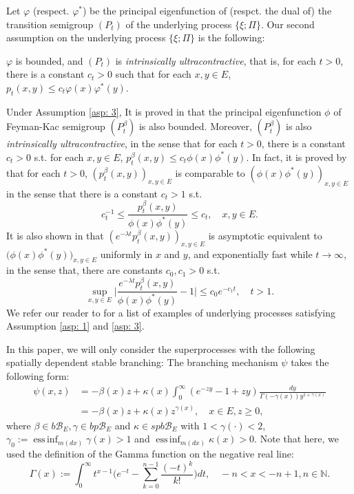 \documentclass[12pt, a4paper]{amsart}
\theoremstyle{definition}
\newenvironment{asp}[1]{\renewcommand\theinnerasp{#1}\innerasp}{\endinnerasp}
\numberwithin{equation}{section}
\begin{document}
	Let $\varphi$ (respect. $\varphi^*$) be the principal eigenfunction of (respct. the dual of) the transition semigroup $(P_t)$ of the underlying process $\{\xi;\Pi\}$. Our second assumption on the underlying process $\{\xi; \Pi\}$ is the following:

\begin{asp}{3} \label{asp: 3}
	$\varphi$ is bounded, and $(P_t)$ is \emph{intrinsically ultracontractive}, that is, for each $t>0$, there is a constant $c_t >0$ such that for each $x,y\in E$, $p_t(x,y) \leq c_t \varphi(x) \varphi^*(y)$.
\end{asp}
	
	Under Assumption \ref{asp: 3},	It is proved in \cite{RenSongZhang2017Central,RenSongZhang2015Limit} that the principal eigenfunction $\phi$ of Feyman-Kac semigroup $(P^\beta_t)$ is also bounded.
	Moreover, $(P^\beta_t)$ is also \emph{intrinsically ultracontractive}, in the sense that for each $t>0$, there is a constant $c_t >0$ s.t. for each $x,y\in E$, $p^\beta_t(x,y) \leq c_t \phi(x) \phi^*(y)$.
	In fact, it is proved by \cite{KimSong2008Intrinsic} that for each $t>0$, $(p^\beta_t(x,y))_{x,y\in E}$ is comparable to $(\phi(x)\phi^*(y))_{x,y\in E}$ in the sense that there is a constant $c_t > 1$ s.t.
\[\label{eq: p-t-beta is comparable to phi phi-star}
	c_t^{-1}
	\leq \frac {p^\beta_t(x,y)} {\phi(x)\phi^*(y)}
	\leq c_t,
	\quad x,y \in E.
\]
	It is also shown in \cite{KimSong2008Intrinsic} that $(e^{-\lambda t}p^\beta_t(x,y))_{x,y\in E}$ is asymptotic equivalent to $\big(\phi(x)\phi^*(y)\big)_{x,y\in E}$ uniformly in $x$ and $y$, and exponentially fast while $t\to \infty$, in the sense that, there are constants $c_0,c_1 > 0$ s.t.
\[\label{eq:q(t,x,y)}
	\sup_{x,y\in E} \big|\frac{e^{-\lambda t}p^\beta_t(x,y)}{\phi(x)\phi^*(y)} - 1 \big| \leq c_0 e^{-c_1 t},
	\quad t > 1.
\]
	We refer our reader to \cite{RenSongZhang2015Limit} for a list of examples of underlying processes satisfying Assumption \ref{asp: 1} and \ref{asp: 3}.

	In this paper, we will only consider the superprocesses with the following spatially dependent stable branching:
\begin{asp}{4} \label{asp: 4}
	The branching mechanism $\psi$ takes the following form:
\[\begin{split}
	\psi(x,z)
	&= - \beta(x) z + \kappa(x) \int_0^\infty (e^{-z y} - 1+ z y) \frac{dy}{\Gamma(- \gamma(x)) y^{1+ \gamma(x)}}
	\\&= -\beta (x) z + \kappa(x) z^{\gamma(x)},
	\quad x\in E, z \geq 0,
\end{split}\]
	where $\beta \in b\mathscr B_E, \gamma \in bp\mathscr B_E$ and $\kappa \in spb\mathscr B_E$ with $1< \gamma(\cdot )<2$, $\gamma_0 := \operatorname{ess\,inf}_{m(dx)} \gamma(x)> 1$ and $\operatorname{ess\,inf}_{m(dx)}\kappa(x) > 0$.
\end{asp}
	Note that here, we used the definition of the Gamma function on the negative real line:
\[\label{eq: definition of Gamma function}
	\Gamma(x)
	:= \int_0^\infty t^{x-1} \Big(e^{-t} - \sum_{k=0}^{n-1} \frac{(-t)^k}{k!}\Big) dt,
	\quad -n< x< -n+1, n\in \mathbb N.
\]
	
\end{document}
